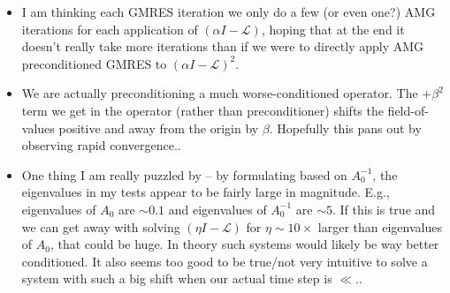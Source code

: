 \documentclass[review]{siamart}
\begin{document}
{\color{blue}
\begin{itemize}
	\item I am thinking each GMRES iteration we only do a few (or even one?) AMG iterations
	for each application of $(\alpha I - \mathcal{L})$, hoping that at the end it doesn't
	really take more iterations than if we were to directly apply AMG preconditioned GMRES
	to $(\alpha I - \mathcal{L})^2$.

	\item We are actually preconditioning a much worse-conditioned operator. The $+\beta^2$
	term we get in the operator (rather than preconditioner) shifts the field-of-values 
	positive and away from the origin by $\beta$. Hopefully this pans out by observing
	rapid convergence..

	\item One thing I am really puzzled by -- by formulating based on $A_0^{-1}$, the
	eigenvalues in my tests appear to be fairly large in magnitude. E.g., eigenvalues of
	$A_0$ are $\sim 0.1$ and eigenvalues of $A_0^{-1}$ are $\sim 5$. If this is true and we
	can get away with solving $(\eta I -\mathcal{L})$ for $\eta \sim 10\times$ larger than
	eigenvalues of $A_0$, that could be huge. In theory such systems would likely be way
	better conditioned. It also seems too good to be true/not very intuitive to solve a
	system with such a big shift when our actual time step is $\ll$..

\end{itemize}
}



% 
% 
\end{document}
